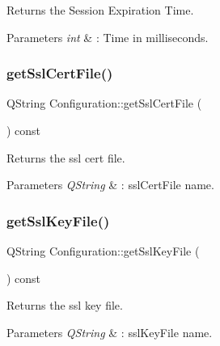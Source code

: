 Returns the Session Expiration Time. 


\begin{DoxyParams}{Parameters}
{\em int} & \+: Time in milliseconds. \\
\hline
\end{DoxyParams}
\mbox{\label{class_configuration_a10405dacfb3b61f60b290c0a5d79a8fb}} 
\subsubsection{\texorpdfstring{get\+Ssl\+Cert\+File()}{getSslCertFile()}}
{\footnotesize\ttfamily Q\+String Configuration\+::get\+Ssl\+Cert\+File (\begin{DoxyParamCaption}{ }\end{DoxyParamCaption}) const\hspace{0.3cm}{\ttfamily [inline]}}



Returns the ssl cert file. 


\begin{DoxyParams}{Parameters}
{\em Q\+String} & \+: ssl\+Cert\+File name. \\
\hline
\end{DoxyParams}
\mbox{\label{class_configuration_a96082bdd3333d8ddf2017a95fe302225}} 
\subsubsection{\texorpdfstring{get\+Ssl\+Key\+File()}{getSslKeyFile()}}
{\footnotesize\ttfamily Q\+String Configuration\+::get\+Ssl\+Key\+File (\begin{DoxyParamCaption}{ }\end{DoxyParamCaption}) const\hspace{0.3cm}{\ttfamily [inline]}}



Returns the ssl key file. 


\begin{DoxyParams}{Parameters}
{\em Q\+String} & \+: ssl\+Key\+File name. \\
\hline
\end{DoxyParams}
\mbox{\label{class_configuration_a3cd126ebe20117c04b4d38797e06551d}} 
